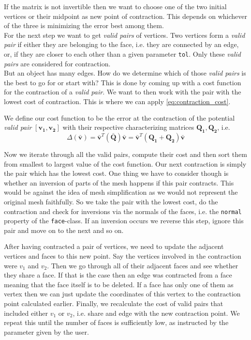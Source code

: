 If the matrix is not invertible then we want to choose one of the two initial vertices or their midpoint as new point of contraction. This depends on whichever of the three is minimizing the error best among them.\\

For the next step we want to get \textit{valid pairs} of vertices. Two vertices form a \textit{valid pair} if either they are belonging to the face, i.e. they are connected by an edge, or, if they are closer to each other than a given parameter \texttt{tol}. Only these \textit{valid pairs} are considered for contraction.\\

But an object has many edges. How do we determine which of those \textit{valid pairs} is the best to go for or start with? This is done by coming up with a cost function for the contraction of a \textit{valid pair}. We want to then work with the pair with the lowest cost of contraction. This is where we can apply \autoref{eq:contraction_cost}.
\begin{defi}
    We define our cost function to be the error at the contraction of the potential \textit{valid pair} $[\bm{v_1},\bm{v_2}]$ with their respective characterizing matrices $\bm{Q_1},\bm{Q_2}$, i.e.
    \begin{equation*}
        \Delta(\bar{\bm{v}})=\bar{\bm{v}}^T(\bar{\bm{Q}})\bar{\bm{v}}=\bar{\bm{v}}^T(\bm{Q_1}+\bm{Q_2})\bar{\bm{v}}
    \end{equation*}
\end{defi}

Now we iterate through all the valid pairs, compute their cost and then sort them from smallest to largest value of the cost function. Our next contraction is simply the pair which has the lowest cost. One thing we have to consider though is whether an inversion of parts of the mesh happens if this pair contracts. This would be against the idea of mesh simplification as we would not represent the original mesh faithfully. So we take the pair with the lowest cost, do the contraction and check for inversions via the normals of the faces, i.e. the \texttt{normal} property of the \texttt{face}-class. If an inversion occurs we reverse this step, ignore this pair and move on to the next and so on.

After having contracted a pair of vertices, we need to update the adjacent vertices and faces to this new point. Say the vertices involved in the contraction were $v_1$ and $v_2$. Then we go through all of their adjacent faces and see whether they share a face. If that is the case then an edge was contracted from a face meaning that the face itself is to be deleted. If a face has only one of them as vertex then we can just update the coordinates of this vertex to the contraction point calculated earlier. Finally, we recalculate the cost of valid pairs that included either $v_1$ or $v_2$, i.e. share and edge with the new contraction point. We repeat this until the number of faces is sufficiently low, as instructed by the parameter given by the user.

